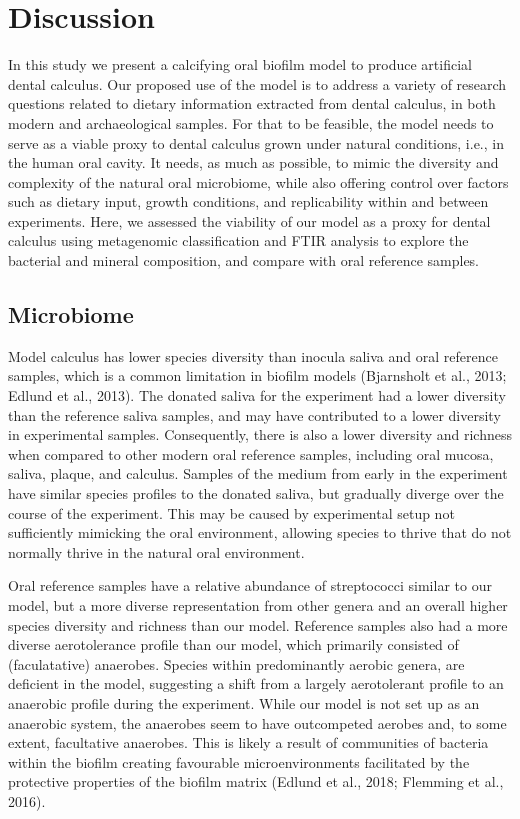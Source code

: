 \documentclass[
]{article}
\begin{document}
\hypertarget{discussion}{%
\section{Discussion}\label{discussion}}

In this study we present a calcifying oral biofilm model to produce
artificial dental calculus. Our proposed use of the model is to address
a variety of research questions related to dietary information extracted
from dental calculus, in both modern and archaeological samples. For
that to be feasible, the model needs to serve as a viable proxy to
dental calculus grown under natural conditions, i.e., in the human oral
cavity. It needs, as much as possible, to mimic the diversity and
complexity of the natural oral microbiome, while also offering control
over factors such as dietary input, growth conditions, and replicability
within and between experiments. Here, we assessed the viability of our
model as a proxy for dental calculus using metagenomic classification
and FTIR analysis to explore the bacterial and mineral composition, and
compare with oral reference samples.

\hypertarget{microbiome}{%
\subsection{Microbiome}\label{microbiome}}

Model calculus has lower species diversity than inocula saliva and oral
reference samples, which is a common limitation in biofilm models
(Bjarnsholt et al., 2013; Edlund et al., 2013). The donated saliva for
the experiment had a lower diversity than the reference saliva samples,
and may have contributed to a lower diversity in experimental samples.
Consequently, there is also a lower diversity and richness when compared
to other modern oral reference samples, including oral mucosa, saliva,
plaque, and calculus. Samples of the medium from early in the experiment
have similar species profiles to the donated saliva, but gradually
diverge over the course of the experiment. This may be caused by
experimental setup not sufficiently mimicking the oral environment,
allowing species to thrive that do not normally thrive in the natural
oral environment.

Oral reference samples have a relative abundance of streptococci similar
to our model, but a more diverse representation from other genera and an
overall higher species diversity and richness than our model. Reference
samples also had a more diverse aerotolerance profile than our model,
which primarily consisted of (faculatative) anaerobes. Species within
predominantly aerobic genera, are deficient in the model, suggesting a
shift from a largely aerotolerant profile to an anaerobic profile during
the experiment. While our model is not set up as an anaerobic system,
the anaerobes seem to have outcompeted aerobes and, to some extent,
facultative anaerobes. This is likely a result of communities of
bacteria within the biofilm creating favourable microenvironments
facilitated by the protective properties of the biofilm matrix (Edlund
et al., 2018; Flemming et al., 2016).
\end{document}
